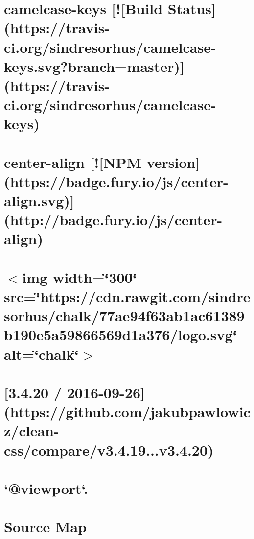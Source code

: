\documentclass[twoside]{book}
\newcommand{\+}{\discretionary{\mbox{\scriptsize$\hookleftarrow$}}{}{}}
\begin{document}
\chapter{camelcase-\/keys \mbox{[}!\mbox{[}Build Status\mbox{]}(https\+://travis-\/ci.org/sindresorhus/camelcase-\/keys.svg?branch=master)\mbox{]}(https\+://travis-\/ci.org/sindresorhus/camelcase-\/keys)}
\label{md_app_web_node_modules_camelcase-keys_readme}

\chapter{center-\/align \mbox{[}!\mbox{[}N\+PM version\mbox{]}(https\+://badge.fury.\+io/js/center-\/align.svg)\mbox{]}(http\+://badge.fury.\+io/js/center-\/align)}
\label{md_app_web_node_modules_center-align__r_e_a_d_m_e}

\chapter{$<$img width=\char`\"{}300\char`\"{} src=\char`\"{}https\+://cdn.\+rawgit.\+com/sindresorhus/chalk/77ae94f63ab1ac61389b190e5a59866569d1a376/logo.\+svg\char`\"{} alt=\char`\"{}chalk\char`\"{}$>$}
\label{md_app_web_node_modules_chalk_readme}

\chapter{\mbox{[}3.4.20 / 2016-\/09-\/26\mbox{]}(https\+://github.com/jakubpawlowicz/clean-\/css/compare/v3.4.19...v3.4.20)}
\label{md_app_web_node_modules_clean-css__history}

\chapter{`@viewport`.}
\label{and}

\chapter{Source Map}
\label{md_app_web_node_modules_clean-css_node_modules_source-map__r_e_a_d_m_e}

\end{document}
